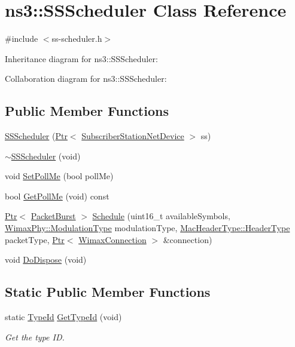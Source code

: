 \hypertarget{classns3_1_1SSScheduler}{}\section{ns3\+:\+:S\+S\+Scheduler Class Reference}
\label{classns3_1_1SSScheduler}


{\ttfamily \#include $<$ss-\/scheduler.\+h$>$}



Inheritance diagram for ns3\+:\+:S\+S\+Scheduler\+:


Collaboration diagram for ns3\+:\+:S\+S\+Scheduler\+:
\subsection*{Public Member Functions}
\begin{DoxyCompactItemize}
\item 
\hyperlink{classns3_1_1SSScheduler_a0a7657aa8fcca27172de6d906078f256}{S\+S\+Scheduler} (\hyperlink{classns3_1_1Ptr}{Ptr}$<$ \hyperlink{classns3_1_1SubscriberStationNetDevice}{Subscriber\+Station\+Net\+Device} $>$ ss)
\item 
\hyperlink{classns3_1_1SSScheduler_a00c4d3385e322af7e3958c6e714c565a}{$\sim$\+S\+S\+Scheduler} (void)
\item 
void \hyperlink{classns3_1_1SSScheduler_a9bad1e75dc4756ee06affaf8b32d385c}{Set\+Poll\+Me} (bool poll\+Me)
\item 
bool \hyperlink{classns3_1_1SSScheduler_a6b3a5424da3f723b72e74e0d8eea3f6f}{Get\+Poll\+Me} (void) const 
\item 
\hyperlink{classns3_1_1Ptr}{Ptr}$<$ \hyperlink{classns3_1_1PacketBurst}{Packet\+Burst} $>$ \hyperlink{classns3_1_1SSScheduler_a6292d6284681cb8299eb5b377cfbf058}{Schedule} (uint16\+\_\+t available\+Symbols, \hyperlink{classns3_1_1WimaxPhy_a044c5d8a48ca992c39c2a946f6e755fa}{Wimax\+Phy\+::\+Modulation\+Type} modulation\+Type, \hyperlink{classns3_1_1MacHeaderType_a54d8fc8bc93a2b7865627965cdd31c20}{Mac\+Header\+Type\+::\+Header\+Type} packet\+Type, \hyperlink{classns3_1_1Ptr}{Ptr}$<$ \hyperlink{classns3_1_1WimaxConnection}{Wimax\+Connection} $>$ \&connection)
\item 
void \hyperlink{classns3_1_1SSScheduler_ad68611861b19965652f68e0594b61d77}{Do\+Dispose} (void)
\end{DoxyCompactItemize}
\subsection*{Static Public Member Functions}
\begin{DoxyCompactItemize}
\item 
static \hyperlink{classns3_1_1TypeId}{Type\+Id} \hyperlink{classns3_1_1SSScheduler_a137694f29033c19eeca69327a586ffce}{Get\+Type\+Id} (void)
\begin{DoxyCompactList}\small\item\em Get the type ID. \end{DoxyCompactList}\end{DoxyCompactItemize}
